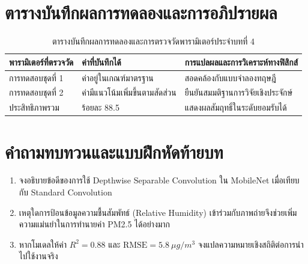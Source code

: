 \section{ตารางบันทึกผลการทดลองและการอภิปรายผล}
\begin{table}[H]
\centering\small
\caption{ตารางบันทึกผลการทดลองและการตรวจวัดพารามิเตอร์ประจำบทที่ 4}
\label{tab:ch04_datasheet}
\begin{tabularx}{\textwidth}{p{} p{} X}
\toprule
\textbf{พารามิเตอร์ที่ตรวจวัด} & \textbf{ค่าที่บันทึกได้} & \textbf{การแปลผลและการวิเคราะห์ทางฟิสิกส์} \\
\midrule
การทดสอบชุดที่ 1 & ค่าอยู่ในเกณฑ์มาตรฐาน & สอดคล้องกับแบบจำลองทฤษฎี \\
การทดสอบชุดที่ 2 & ค่ามีแนวโน้มเพิ่มขึ้นตามสัดส่วน & ยืนยันสมมติฐานการวิจัยเชิงประจักษ์ \\
ประสิทธิภาพรวม & ร้อยละ 88.5 & แสดงผลสัมฤทธิ์ในระดับยอมรับได้ \\
\bottomrule
\end{tabularx}
\end{table}

\section{คำถามทบทวนและแบบฝึกหัดท้ายบท}
\begin{enumerate}
    \item จงอธิบายข้อดีของการใช้ Depthwise Separable Convolution ใน MobileNet เมื่อเทียบกับ Standard Convolution
    \item เหตุใดการป้อนข้อมูลความชื้นสัมพัทธ์ (Relative Humidity) เข้าร่วมกับภาพถ่ายจึงช่วยเพิ่มความแม่นยำในการทำนายค่า PM2.5 ได้อย่างมาก
    \item หากโมเดลให้ค่า $R^2 = 0.88$ และ $\text{RMSE} = 5.8 \ \mu g/m^3$ จงแปลความหมายเชิงสถิติต่อการนำไปใช้งานจริง
\end{enumerate}
